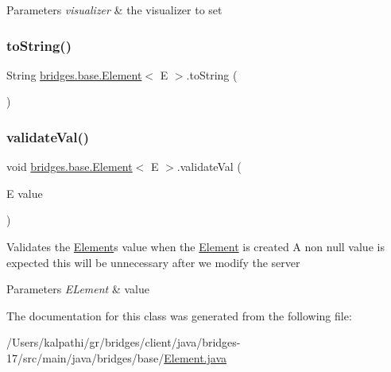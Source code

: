 \begin{DoxyParams}{Parameters}
{\em visualizer} & the visualizer to set \\
\hline
\end{DoxyParams}
\mbox{\label{classbridges_1_1base_1_1_element_a7dc685e317fd9dc2e73e049a9f907e42}} 
\subsubsection{\texorpdfstring{to\+String()}{toString()}}
{\footnotesize\ttfamily String \mbox{\hyperlink{classbridges_1_1base_1_1_element}{bridges.\+base.\+Element}}$<$ E $>$.to\+String (\begin{DoxyParamCaption}{ }\end{DoxyParamCaption})}

\mbox{\label{classbridges_1_1base_1_1_element_af1a60f4e6a91d379179f7d56e6dc3829}} 
\subsubsection{\texorpdfstring{validate\+Val()}{validateVal()}}
{\footnotesize\ttfamily void \mbox{\hyperlink{classbridges_1_1base_1_1_element}{bridges.\+base.\+Element}}$<$ E $>$.validate\+Val (\begin{DoxyParamCaption}\item[{E}]{value }\end{DoxyParamCaption})\hspace{0.3cm}{\ttfamily [protected]}}

Validates the \mbox{\hyperlink{classbridges_1_1base_1_1_element}{Element}}\textquotesingle{}s value when the \mbox{\hyperlink{classbridges_1_1base_1_1_element}{Element}} is created A non null value is expected this will be unnecessary after we modify the server 
\begin{DoxyParams}{Parameters}
{\em E\+Lement} & value \\
\hline
\end{DoxyParams}


The documentation for this class was generated from the following file\+:\begin{DoxyCompactItemize}
\item 
/\+Users/kalpathi/gr/bridges/client/java/bridges-\/17/src/main/java/bridges/base/\mbox{\hyperlink{_element_8java}{Element.\+java}}\end{DoxyCompactItemize}
